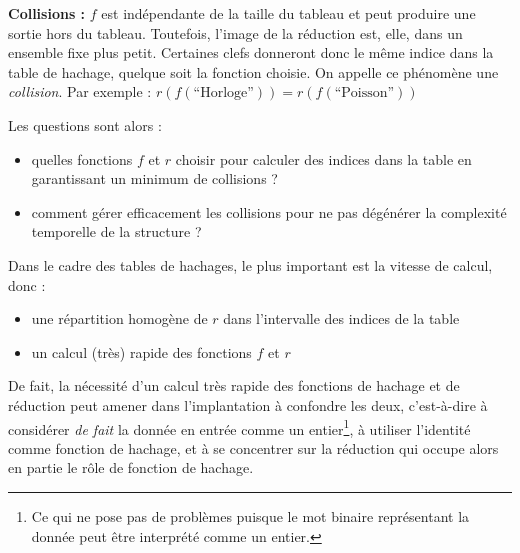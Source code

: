 \documentclass[../../../main.tex]{subfiles}
\begin{document}
\begin{minipage}{\textwidth}
	\begin{center}
		
	\end{center}
\end{minipage}

\textbf{Collisions :} $f$ est indépendante de la taille du tableau et peut produire une sortie hors du tableau. Toutefois, l'image de la réduction est, elle, dans un ensemble fixe plus petit. Certaines clefs donneront donc le même indice dans la table de hachage, quelque soit la fonction choisie. On appelle ce phénomène une \textit{collision}. Par exemple : $r(f(\text{``Horloge''})) = r(f(\text{``Poisson''}))$

\begin{minipage}{\textwidth}
	\begin{center}
		
	\end{center}
\end{minipage}

Les questions sont alors :
\begin{itemize}
	\item quelles fonctions $f$ et $r$ choisir pour calculer des indices dans la table en garantissant un minimum de collisions ?
	\item comment gérer efficacement les collisions pour ne pas dégénérer la complexité temporelle de la structure ? 
\end{itemize}
Dans le cadre des tables de hachages, le plus important est la vitesse de calcul, donc :
\begin{itemize}
	\item une répartition homogène de $r$ dans l'intervalle des indices de la table
	\item un calcul (très) rapide des fonctions $f$ et $r$
\end{itemize}
De fait, la nécessité d'un calcul très rapide des fonctions de hachage et de réduction peut amener dans l'implantation à confondre les deux, c'est-à-dire à considérer \textit{de fait} la donnée en entrée comme un entier\footnote{Ce qui ne pose pas de problèmes puisque le mot binaire représentant la donnée peut être interprété comme un entier.}, à utiliser l'identité comme fonction de hachage, et à se concentrer sur la réduction qui occupe alors en partie le rôle de fonction de hachage.
\end{document}
